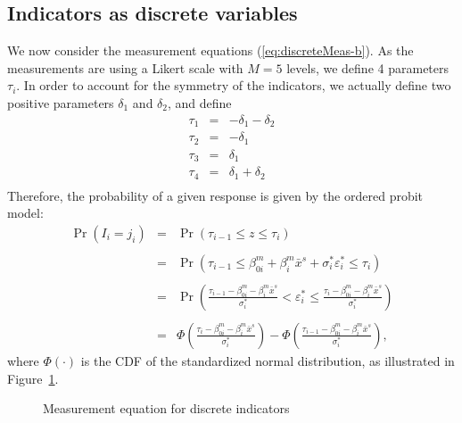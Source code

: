 \documentclass[12pt,a4paper]{article}
\newcommand{\req}[1]{(\ref{#1})}
\newcommand{\prob}{\operatorname{Pr}}
\begin{document}
\subsection{Indicators as discrete variables}
\label{sec:discrete}

We now consider the measurement equations
\req{eq:discreteMeas-b}.
As the measurements are using a Likert scale with $M=5$ levels, we
define 4 parameters $\tau_i$. In order to account for the symmetry of
the indicators, we actually define two positive parameters $\delta_1$ and
$\delta_2$, and define
\[
\begin{array}{rcl}
\tau_1 &=& -\delta_1 - \delta_2 \\
\tau_2 &=& -\delta_1 \\
\tau_3 &=& \delta_1 \\
\tau_4 &=& \delta_1 + \delta_2 \\
\end{array}
\]
Therefore, the probability of a given response is given by the ordered
probit model:
\begin{equation}
\label{eq:likelihoodOrderedProbit}
\begin{array}{rcl}
\prob(I_i = j_i) &=& \prob(\tau_{i-1} \leq z \leq \tau_i) \\ & \\
           &=& \prob(\tau_{i-1} \leq  \beta_{0i}^m +\beta^m_i \bar{x}^s +
\sigma^*_i \varepsilon_i^*  \leq \tau_i) \\ & \\
           &=& \prob\left(\frac{\tau_{i-1} - \beta_{0i}^m - \beta^m_i \bar{x}^s}{\sigma^*_i}
< 
 \varepsilon_i^*  \leq \frac{\tau_i - \beta_{0i}^m - \beta^m_i
 \bar{x}^s}{\sigma^*_i}\right) \\ & \\
&=&\Phi\left(\frac{\tau_i - \beta_{0i}^m - \beta^m_i
 \bar{x}^s}{\sigma^*_i}\right) - \Phi\left(\frac{\tau_{i-1} - \beta_{0i}^m - \beta^m_i \bar{x}^s}{\sigma^*_i}\right),
\end{array}
\end{equation}
where $\Phi(\cdot)$ is the CDF of the standardized normal
distribution, as illustrated in Figure~\ref{fig:ordinal}.

\begin{figure}[htb]

\caption{\label{fig:ordinal}Measurement equation for discrete indicators}
\end{figure}
\end{document}
